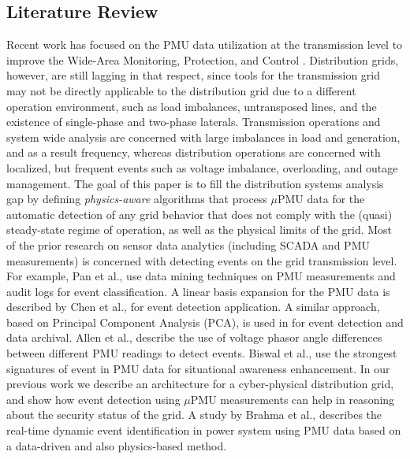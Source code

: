 \documentclass[twocolumn]{IEEEtran}
\newcommand{\mup}{\mu \text{PMU}}
\begin{document}
\subsection{Literature Review} 
Recent work has focused on the PMU data utilization at the transmission level to improve the Wide-Area Monitoring, Protection, and Control \cite{phadke2008wide,terzija2011wide}. Distribution grids, however, are still lagging in that respect, since tools for the transmission grid may not be directly applicable to the distribution grid due to a different operation environment, such as load imbalances, untransposed lines, and the existence of single-phase and two-phase laterals. Transmission operations and system wide analysis are concerned with large imbalances in load and
generation, and as a result frequency, whereas distribution operations are concerned with localized, but
frequent events such as voltage imbalance, overloading, and outage management. The goal of this paper is to fill the distribution systems analysis gap by defining {\it physics-aware} algorithms that process $\mup$ data for the automatic detection of any grid behavior that does not comply with the (quasi) steady-state regime of operation, as well as the physical limits of the grid.       
Most of the prior research on sensor data analytics (including SCADA and PMU measurements) is concerned with detecting events on the grid transmission level. For example, Pan et al., \cite{pan2015developing} use data mining techniques on PMU measurements and audit logs for event classification. A linear basis expansion for the PMU data is described by Chen et al., \cite{chen2013dimensionality,xie2014dimensionality} for event detection application. A similar approach, based on Principal Component Analysis (PCA), is used in \cite{valenzuela2013real, ge2015power} for event detection and data archival.
Allen et al., \cite{allen2014pmu} describe the use of voltage phasor angle differences between different PMU readings to detect events. Biswal et al., \cite{biswalsupervisory} use the strongest signatures of event in PMU data for situational awareness enhancement. In our previous work \cite{jamei2016micro} we describe an architecture for a cyber-physical distribution grid, and show how event detection using $\mup$ measurements can help in reasoning about the security status of the grid.
A study by Brahma et al., \cite{brahmareal} describes the real-time dynamic event identification in power system using PMU data based on a data-driven and also physics-based method.
\end{document}
